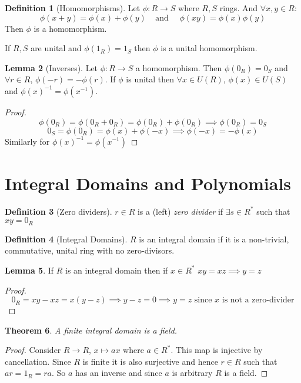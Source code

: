 \documentclass[11pt,a4paper]{article}
\newtheorem{theorem}{Theorem}[section]
\theoremstyle{definition}
\newtheorem{definition}[theorem]{Definition}
\newtheorem{lemma}[theorem]{Lemma}
\begin{document}
\begin{definition}[Homomorphisms]
Let $\phi: R \longrightarrow S$ where $R, S$ rings. And $\forall x, y \in R$:
\[
	\phi(x + y) = \phi(x) + \phi(y) \ \ \ \ \ \text{and} \ \ \ \ \ \  \phi(xy) = \phi(x) \phi(y)
\]
Then $\phi$ is a homomorphism.

If $R, S$ are unital and $\phi(1_R) = 1_S$ then $\phi$ is a unital homomorphism.
\end{definition}

\begin{lemma}[Inverses]
Let $\phi: R \longrightarrow S$ a homomorphism. Then $\phi(0_R) = 0_S$ and $\forall r \in R$,  $\phi(-r) = -\phi(r)$. If $\phi$ is unital then $\forall x \in U(R)$, $\phi(x) \in U(S)$ and $\phi(x)^{-1} = \phi(x^{-1})$.
\end{lemma}

\begin{proof}
\[
	\phi(0_R) = \phi(0_R + 0_R) = \phi(0_R) + \phi(0_R) \implies \phi(0_R) = 0_S
\]
\[
	0_S = \phi(0_R) = \phi(x) + \phi(-x) \implies \phi(-x) = -\phi(x) 
\]
Similarly for $\phi(x)^{-1} = \phi(x^{-1})$
\end{proof}

\section{Integral Domains and Polynomials}

\begin{definition}[Zero dividers]
$r \in R$ is a (left) \emph{zero divider} if $\exists s \in R^*$ such that $xy = 0_R$
\end{definition}

\begin{definition}[Integral Domains]
$R$ is an integral domain if it is a non-trivial, commutative, unital ring with no zero-divisors.
\end{definition}

\begin{lemma}
	If $R$ is an integral domain then if $x\in R^*$ $xy=xz \implies y = z$
\end{lemma}

\begin{proof}
\[
	0_R = xy - xz = x(y-z) \implies y-z = 0\implies y = z \text{ since } x \text{ is not a zero-divider}
\]
\end{proof}

\begin{theorem} 
A finite integral domain is a field.
\end{theorem}

\begin{proof}
Consider $R \longrightarrow R$, $x \mapsto ax$ where $a \in R^*$. This map is injective by cancellation. Since $R$ is finite it is also surjective and hence $r \in R$ such that $ar = 1_R = ra$. So $a$ has an inverse and since $a$ is arbitrary $R$ is a field.
\end{proof}
\end{document}

